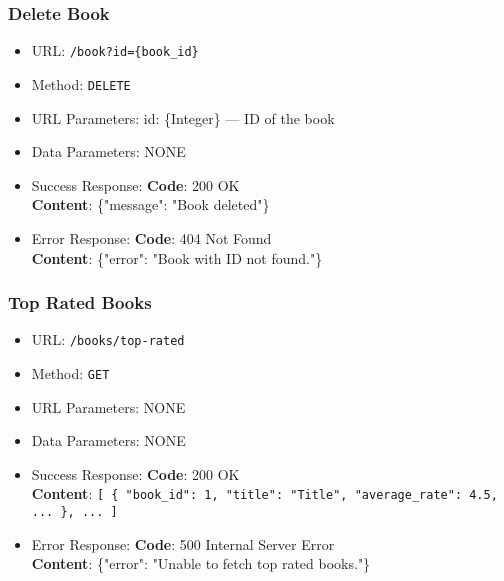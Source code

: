 \subsubsection*{Delete Book}

\begin{itemize}
    \item URL: \texttt{/book?id=\{book\_id\}}
    \item Method: \texttt{DELETE}
    \item URL Parameters: id: \{Integer\} — ID of the book
    \item Data Parameters: NONE

    \item Success Response: \newline
    \textbf{Code}: 200 OK \\
    \textbf{Content}: \{"message": "Book deleted"\}

    \item Error Response: \newline
    \textbf{Code}: 404 Not Found \\
    \textbf{Content}: \{"error": "Book with ID not found."\}
\end{itemize}

\subsubsection*{Top Rated Books}

\begin{itemize}
    \item URL: \texttt{/books/top-rated}
    \item Method: \texttt{GET}
    \item URL Parameters: NONE
    \item Data Parameters: NONE

    \item Success Response: \newline
    \textbf{Code}: 200 OK \\
    \textbf{Content}: \texttt{[ \{ "book\_id": 1, "title": "Title", "average\_rate": 4.5, ... \}, ... ]}

    \item Error Response: \newline
    \textbf{Code}: 500 Internal Server Error \\
    \textbf{Content}: \{"error": "Unable to fetch top rated books."\}
\end{itemize}

